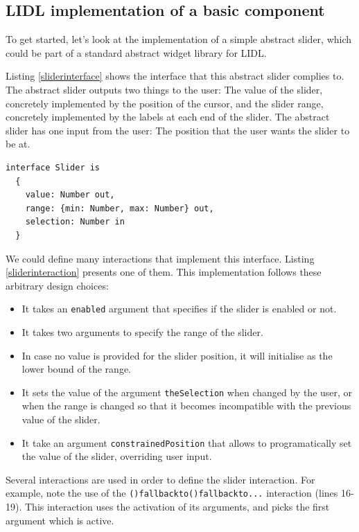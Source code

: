 \documentclass[10pt]{sigplanconf}
\newcommand{\code}[1]{\lstinline{#1}}
\begin{document}
\subsection{LIDL implementation of a basic component}

To get started, let's look at the implementation of a simple abstract slider, which could be part of a standard abstract widget library for LIDL.



Listing \ref{sliderinterface} shows the interface that this abstract slider complies to. The abstract slider outputs two things to the user: The value of the slider, concretely implemented by the position of the cursor, and the slider range, concretely implemented by the labels at each end of the slider. The abstract slider has one input from the user: The position that the user wants the slider to be at. 


\begin{lstlisting}[caption=The interface of an abstract slider,label=sliderinterface]
interface Slider is
  {
    value: Number out,
    range: {min: Number, max: Number} out,
    selection: Number in
  }
\end{lstlisting}


We could define many interactions that implement this interface. Listing \ref{sliderinteraction} presents one of them. This implementation follows these arbitrary design choices:

\begin{itemize}
  \item It takes an \code{enabled} argument that specifies if the slider is enabled or not.
  \item It takes two arguments to specify the range of the slider.
  \item In case no value is provided for the slider position, it will initialise as the lower bound of the range.
  \item It sets the value of the argument \code{theSelection} when changed by the user, or when the range is changed so that it becomes incompatible with the previous value of the slider.
  \item It take an argument \code{constrainedPosition} that allows to programatically set the value of the slider, overriding user input.
\end{itemize}

Several interactions are used in order to define the slider interaction. For example, note the use of the \code{()fallbackto()fallbackto...} interaction (lines 16-19). This interaction uses the activation of its arguments, and picks the first argument which is active.
\end{document}
